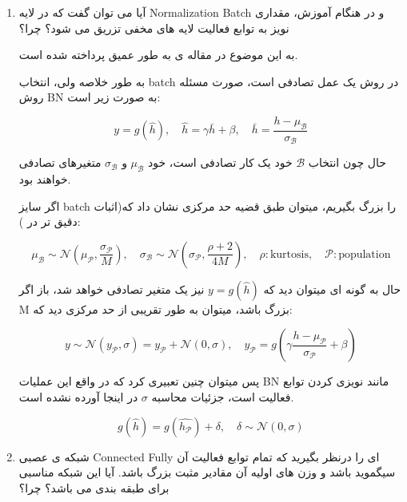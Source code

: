 \begin{enumerate}
{	      }
	\item {
	      آیا می توان گفت که در لایه Normalization Batch و در هنگام آموزش، مقداری نویز به توابع فعالیت
	      لایه های مخفی تزریق می شود؟ چرا؟

	      \begin{qsolve}[]
			به این موضوع در مقاله ی \cite{luo2019understanding} به طور عمیق پرداخته شده است.
			
			به طور خلاصه ولی، انتخاب batch در روش  یک عمل تصادفی است، 
			صورت مسئله روش BN به صورت زیر است:

			\[
				y=g(\hat{h}),\quad \hat{h}=\gamma \bar{h} + \beta,\quad \bar{h} = \frac{h-\mu_{\mathcal{B}}}{\sigma_{\mathcal{B}}}	
			\]

			حال چون انتخاب $\mathcal{B}$ خود یک کار تصادفی است، خود $\mu_{\mathcal{B}}$ و $\sigma_{\mathcal{B}}$ متغیرهای تصادفی خواهند بود.

			اگر سایز batch را بزرگ بگیریم، میتوان طبق قضیه حد مرکزی نشان داد که(اثبات دقیق تر در \cite{teye2018bayesian}): 

			\[
				\mu_{\mathcal{B}}\sim\mathcal{N}(\mu_{\mathcal{P}}, \frac{\sigma_{\mathcal{P}}}{M}),
				\quad 
				\sigma_{\mathcal{B}}\sim\mathcal{N}(\sigma_{\mathcal{P}}, \frac{{\rho+2}}{4M}),
				\quad 
				\rho:\text{kurtosis},
				\quad
				\mathcal{P}:\text{population}
			\]

			\splitqsolve
			
			حال به گونه ای میتوان دید که $y=g(\hat{h})$ نیز یک متغیر تصادفی خواهد شد، باز اگر M بزرگ باشد، میتوان به طور تقریبی از حد مرکزی 
			دید که:

			\[
				y\sim\mathcal{N}(y_\mathcal{P}, \sigma)=y_{\mathcal{P}}+\mathcal{N}(0, \sigma),\quad
				y_{\mathcal{P}}=g\left(\gamma\frac{h-\mu_{\mathcal{P}}}{\sigma_{\mathcal{P}}}+\beta\right)
			\]

			پس میتوان چنین تعبیری کرد که در واقع این عملیات BN مانند نویزی کردن توابع فعالیت است، جزئیات محاسبه $\sigma$ 
			در اینجا آورده نشده است.

			\[
				g(\hat{h})=g(\hat{h_{\mathcal{P}}})+\delta,\quad \delta\sim\mathcal{N}(0,\sigma)
			\]
	      \end{qsolve}
	      }

	\item {
	      شبکه ی عصبی Connected Fully ای را درنظر بگیرید که تمام توابع فعالیت آن سیگموید باشد و وزن
	      های اولیه آن مقادیر مثبت بزرگ باشد. آیا این شبکه مناسبی برای طبقه بندی می باشد؟ چرا؟

	      \begin{qsolve}[]


\end{qsolve}}
\end{enumerate}
